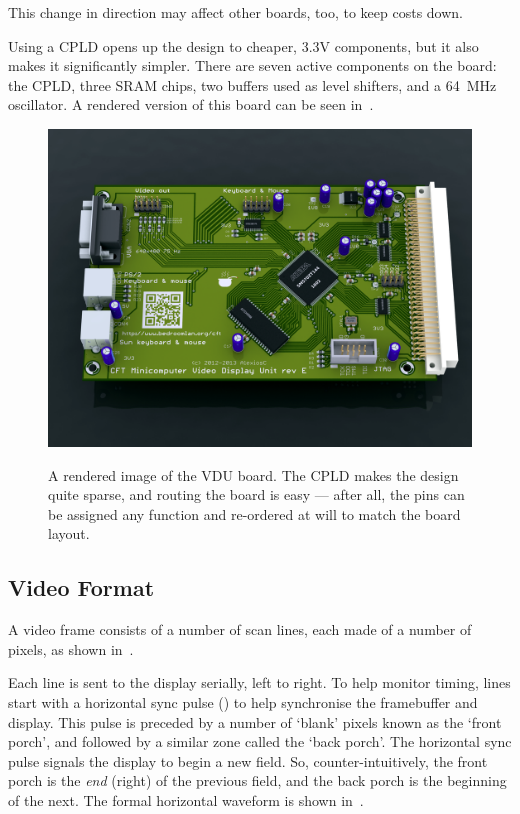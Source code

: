 This change in direction may affect other boards, too, to keep costs down.

Using a CPLD opens up the design to cheaper, 3.3V components, but it
also makes it significantly simpler. There are seven active components
on the board: the CPLD, three SRAM chips, two  buffers used
as level shifters, and a 64~MHz oscillator. A rendered version of this
board can be seen in~.

\begin{figure}
\centering
\includegraphics[width=0.85\columnwidth]{figs/cft-vdu-board3.png}\vspace{1em}\\
\caption{\label{fig:vdu-board}A rendered image of the VDU board. The CPLD makes
  the design quite sparse, and routing the board is easy — after all, the pins
  can be assigned any function and re-ordered at will to match the board
  layout.}
\end{figure}


\subsection{Video Format}

A video frame consists of a number of scan lines, each made of a
number of pixels, as shown in~.

Each line is sent to the display serially, left to right. To help monitor
timing, lines start with a horizontal sync pulse () to help
synchronise the framebuffer and display. This pulse is preceded by a number of
‘blank’ pixels known as the ‘front porch’, and followed by a similar zone
called the ‘back porch’. The horizontal sync pulse signals the display to begin
a new field. So, counter-intuitively, the front porch is the {\em end\/}
(right) of the previous field, and the back porch is the beginning of the
next. The formal horizontal waveform is shown in~.

